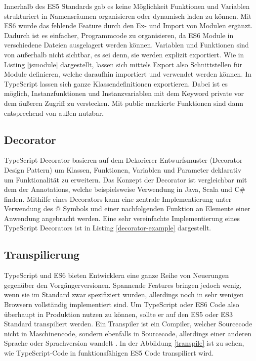 Innerhalb des ES5 Standards gab es keine Möglichkeit Funktionen und Variablen strukturiert in Namensräumen organisieren oder dynamisch laden zu können.
Mit ES6 wurde das fehlende Feature durch den Ex- und Import von Modulen ergänzt. Dadurch ist es einfacher, Programmcode zu organisieren,
da ES6 Module in verschiedene Dateien ausgelagert werden können. Variablen und Funktionen sind von außerhalb nicht sichtbar, es sei denn, sie werden explizit exportiert.
Wie in Listing \ref{jsmodule} dargestellt, lassen sich mittels Export also Schnittstellen für Module definieren, welche daraufhin importiert und verwendet werden können.
In TypeScript lassen sich ganze Klassendefinitionen exportieren.
Dabei ist es möglich, Instanzfunktionen und Instanzvariablen mit dem Keyword private vor dem äußeren Zugriff zu verstecken.
Mit public markierte Funktionen sind dann entsprechend von außen nutzbar.

\vspace{0.3cm}


\subsection{Decorator}

TypeScript Decorator basieren auf dem Dekorierer Entwurfsmuster (Decorator Design Pattern) um Klassen,
Funktionen, Variablen und Parameter deklarativ um Funktionalität zu erweitern.
Das Konzept der Decorator ist vergleichbar mit dem der Annotations, welche beispielsweise Verwendung in Java, Scala und C\#
finden.
Mithilfe eines Decorators kann eine zentrale Implementierung
unter Verwendung des @ Symbols und einer nachfolgenden Funktion an Elemente einer Anwendung angebracht werden.
Eine sehr vereinfachte Implementierung eines TypeScript Decorators ist in Listing \ref{decorator-example} dargestellt.

\vspace{0.3cm}

\vspace{0.3cm}


\subsection{Transpilierung}

TypeScript und ES6 bieten Entwicklern eine ganze Reihe von Neuerungen gegenüber den Vorgängerversionen.
Spannende Features bringen jedoch wenig, wenn sie im Standard zwar spezifiziert wurden,
allerdings noch in sehr wenigen Browsern vollständig implementiert sind.
Um TypeScript oder ES6 Code also überhaupt in Produktion nutzen zu können, sollte er auf den ES5 oder ES3
Standard transpiliert werden.
Ein Transpiler ist ein Compiler, welcher Sourcecode nicht in Maschinencode, sondern ebenfalls in Sourcecode,
allerdings einer anderen Sprache oder Sprachversion wandelt \cite{Introduction-to-the-Typescript-Transpiler}.
In der Abbildung \ref{transpile} ist zu sehen, wie TypeScript-Code in funktionsfähigen ES5 Code transpiliert wird.

